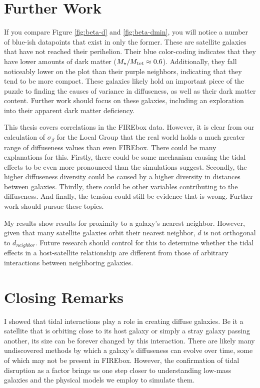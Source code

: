 \section{Further Work}

If you compare Figure \ref{fig:beta-d} and \ref{fig:beta-dmin}, you will notice a number of blue-ish datapoints that exist in only the former. These are satellite galaxies that have not reached their perihelion. Their blue color-coding indicates that they have lower amounts of dark matter ($M_\star / M_{\rm{tot}} \approx 0.6$). Additionally, they fall noticeably lower on the plot than their purple neighbors, indicating that they tend to be more compact. These galaxies likely hold an important piece of the puzzle to finding the causes of variance in diffuseness, as well as their dark matter content. Further work should focus on these galaxies, including an exploration into their apparent dark matter deficiency.

This thesis covers correlations in the FIREbox data. However, it is clear from our calculation of $\sigma_\beta$ for the Local Group that the real world holds a much greater range of diffuseness values than even FIREbox. There could be many explanations for this. Firstly, there could be some mechanism causing the tidal effects to be even more pronounced than the simulations suggest. Secondly, the higher diffuseness diversity could be caused by a higher diversity in distances between galaxies. Thirdly, there could be other variables contributing to the diffuseness. And finally, the tension could still be evidence that \lcdm\* is wrong. Further work should pursue these topics.

My results show results for proximity to a galaxy's nearest neighbor. However, given that many satellite galaxies orbit their nearest neighbor, $d$ is not orthogonal to $d_{neighbor}$. Future research should control for this to determine whether the tidal effects in a host-satellite relationship are different from those of arbitrary interactions between neighboring galaxies.

\section{Closing Remarks}

I showed that tidal interactions play a role in creating diffuse galaxies. Be it a satellite that is orbiting close to its host galaxy or simply a stray galaxy passing another, its size can be forever changed by this interaction. There are likely many undiscovered methods by which a galaxy's diffuseness can evolve over time, some of which may not be present in FIREbox. However, the confirmation of tidal disruption as a factor brings us one step closer to understanding low-mass galaxies and the physical models we employ to simulate them.